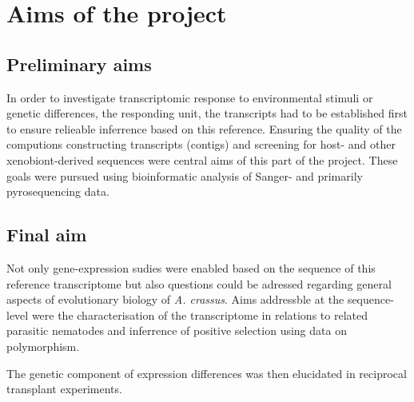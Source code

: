 
\chapter{Aims of the project} %



\section{Preliminary aims}

In order to investigate transcriptomic response to environmental
stimuli or genetic differences, the responding unit, the transcripts
had to be established first to ensure relieable inferrence based on
this reference. Ensuring the quality of the computions constructing
transcripts (contigs) and screening for host- and other
xenobiont-derived sequences were central aims of this part of the
project. These goals were pursued using bioinformatic analysis of
Sanger- and primarily pyrosequencing data.

\section{Final aim}

Not only gene-expression sudies were enabled based on the sequence of
this reference transcriptome but also questions could be adressed
regarding general aspects of evolutionary biology of
\textit{A. crassus}. Aims addressble at the sequence-level were the
characterisation of the transcriptome in relations to related
parasitic nematodes and inferrence of positive selection using data on
polymorphism.

The genetic component of expression differences was then elucidated in
reciprocal transplant experiments.




     